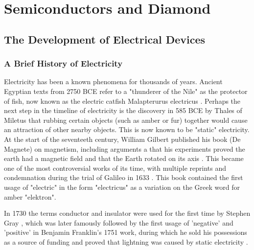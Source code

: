 
\chapter{Semiconductors and Diamond}

\ifpdf
    \graphicspath{{Chapter1/Figs/Raster/}{Chapter1/Figs/PDF/}{Chapter1/Figs/}}
\else
    \graphicspath{{Chapter1/Figs/Vector/}{Chapter1/Figs/}}
\fi


\label{ch:semiconductors_and_diamond}

\section{The Development of Electrical Devices}
\subsection{A Brief History of Electricity}
Electricity has been a known phenomena for thousands of years. Ancient Egyptian texts from 2750 BCE refer to a "thunderer of the Nile" as the protector of fish, now known as the electric catfish Malapterurus electricus \cite{moller1991}. Perhaps the next step in the timeline of electricity is the discovery in 585 BCE by Thales of Miletus that rubbing certain objects (such as amber or fur) together would cause an attraction of other nearby objects. This is now known to be "static" electricity. At the start of the seventeeth century, William Gilbert published his book (De Magnete) on magnetism, including arguments a that his experiments proved the earth had a magnetic field and that the Earth rotated on its axis \cite{gilbert1600}. This became one of the most controversial works of its time, with multiple reprints and condemnation during the trial of Galileo in 1633 \cite{linder2002}. This book contained the first usage of "electric" in the form "electricus" as a variation on the Greek word for amber "elektron".

In 1730 the terms conductor and insulator were used for the first time by Stephen Gray \cite{carnle1931}, which was later famously followed by the first usage of 'negative' and 'positive' in Benjamin Franklin's 1751 work, during which he sold his possessions as a source of funding and proved that lightning was caused by static electricity \cite{park1898} \cite{uman1986}. 

